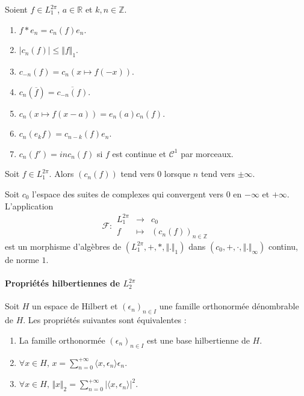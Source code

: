   \begin{proposition}
    Soient $f \in L_1^{2 \pi}$, $a \in \mathbb{R}$ et $k, n \in \mathbb{Z}$.
    \begin{enumerate}[label=(\roman*)]
      \item $f * e_n = c_n(f) e_n$.
      \item $\vert c_n(f) \vert \leq \Vert f \Vert_1$.
      \item $c_{-n}(f) = c_n(x \mapsto f(-x))$.
      \item $c_n(\overline{f}) = \overline{c_{-n}(f)}$.
      \item $c_n(x \mapsto f(x-a)) = e_n(a) c_n(f)$.
      \item $c_n(e_k f) = c_{n-k}(f) e_n$.
      \item $c_n(f') = in c_n(f)$ si $f$ est continue et $\mathcal{C}^1$ par morceaux.
    \end{enumerate}
  \end{proposition}


  \begin{lemma}
    Soit $f \in L_1^{2 \pi}$. Alors $(c_n(f))$ tend vers $0$ lorsque $n$ tend vers $\pm \infty$.
  \end{lemma}

  \begin{theorem}
    \label{246-1}
    Soit $c_0$ l'espace des suites de complexes qui convergent vers $0$ en $-\infty$ et $+\infty$. L'application
    \[
    \mathcal{F} :
    \begin{array}{ccc}
      L_1^{2\pi} &\rightarrow& c_0 \\
      f &\mapsto& (c_n(f))_{n \in \mathbb{Z}}
    \end{array}
    \]
    est un morphisme d'algèbres de $(L_1^{2\pi}, +, *, \Vert . \Vert_1)$ dans $(c_0, +, \cdot, \Vert . \Vert_\infty)$ continu, de norme $1$.
  \end{theorem}

  \paragraph{Propriétés hilbertiennes de \texorpdfstring{$L_2^{2 \pi}$}{L₂²ᵖⁱ}}


  \begin{theorem}
    \label{246-2}
    Soit $H$ un espace de Hilbert et $(\epsilon_n)_{n \in I}$ une famille orthonormée dénombrable de $H$. Les propriétés suivantes sont équivalentes :
    \begin{enumerate}[label=(\roman*)]
      \item La famille orthonormée $(\epsilon_n)_{n \in I}$ est une base hilbertienne de $H$.
      \item $\forall x \in H, \, x = \sum_{n=0}^{+\infty} \langle x, \epsilon_n \rangle \epsilon_n$.
      \item \label{246-3} $\forall x \in H, \, \Vert x \Vert_2 = \sum_{n=0}^{+\infty} \vert \langle x, \epsilon_n \rangle \vert^2$.
    \end{enumerate}
  \end{theorem}

